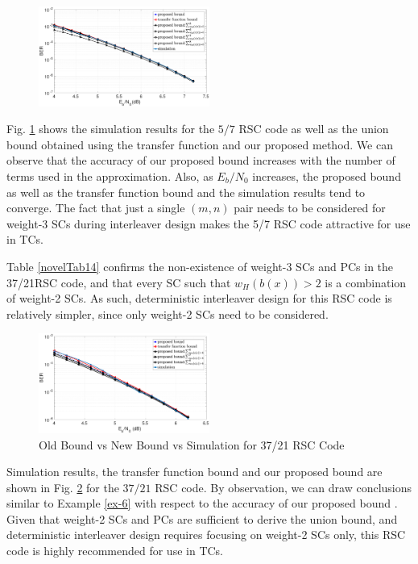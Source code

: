 \begin{figure}[htbp]
	\centering
	\includegraphics[width=0.5\textwidth]{./Images/RSC_5_7_lower_weights2.eps}
	\label{simFig1}
\end{figure}

Fig. \ref{simFig1} shows the simulation results for the $5/7$ RSC code as well as the union bound obtained using the transfer function and our proposed method. We can observe that the accuracy of our proposed bound increases with the number of terms used in the approximation. Also, as $E_b/N_0$ increases, the proposed bound as well as the transfer function bound and the simulation results tend to converge. The fact that just a single $(m,n)$ pair needs to be considered for weight-3 SCs during interleaver design makes the 5/7 RSC code attractive for use in TCs.
\label{ex-6}


Table \ref{novelTab14} confirms the non-existence of weight-3 SCs and PCs in the 37/21RSC code, and that every SC such that $w_H(b(x)) > 2$ is a combination of weight-2 SCs. As such, deterministic interleaver design for this RSC code is relatively simpler, since only weight-2 SCs need to be considered.
\begin{figure}[htbp]
	\centering
	\includegraphics[width=0.5\textwidth]{./Images/RSC_37_21_lower_weights2.eps}
	\caption{Old Bound vs New Bound vs Simulation for 37/21 RSC Code}
	\label{simFig2}
\end{figure}

Simulation results, the transfer function bound and our proposed bound are shown in Fig. \ref{simFig2} for the $37/21$ RSC code. By observation, we can draw conclusions similar to  Example \ref{ex-6} with respect to the accuracy of our proposed bound . Given that weight-2 SCs and PCs are sufficient to derive the union bound, and deterministic interleaver design requires focusing on weight-2 SCs only, this RSC code is highly recommended for use in TCs.

